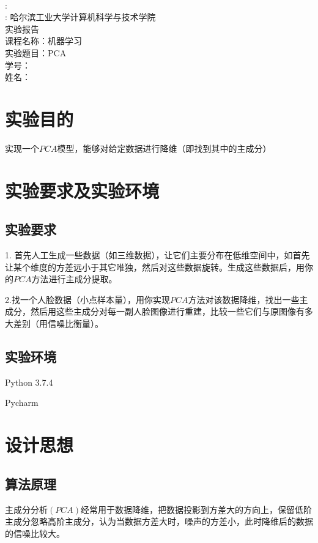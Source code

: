 \documentclass[UTF8]{ctexart}
\numberwithin{equation}{section}
\begin{document}
	\begin{center}  %
		~\\:
		~\\:
		\huge
		哈尔滨工业大学计算机科学与技术学院 \\
		\Huge 
		实验报告 \\[5cm]
		\LARGE
		课程名称：机器学习 \\
		实验题目：PCA \\
		学号： \\
		姓名： \\
		\thispagestyle{empty}
		\clearpage  %
	\end{center}
	
	\section{实验目的}
	实现一个$PCA$模型，能够对给定数据进行降维（即找到其中的主成分）
	\section{实验要求及实验环境}
	
	\subsection{实验要求}
	
	1. 首先人工生成一些数据（如三维数据），让它们主要分布在低维空间中，如首先让某个维度的方差远小于其它唯独，然后对这些数据旋转。生成这些数据后，用你的$PCA$方法进行主成分提取。
	
	2.找一个人脸数据（小点样本量），用你实现$PCA$方法对该数据降维，找出一些主成分，然后用这些主成分对每一副人脸图像进行重建，比较一些它们与原图像有多大差别（用信噪比衡量）。
	
	\subsection{实验环境}
	
	Python 3.7.4
	
	Pycharm
	
	\section{设计思想}
	
	\subsection{算法原理}
	主成分分析$(PCA)$经常用于数据降维，把数据投影到方差大的方向上，保留低阶主成分忽略高阶主成分，认为当数据方差大时，噪声的方差小，此时降维后的数据的信噪比较大。
\end{document}
